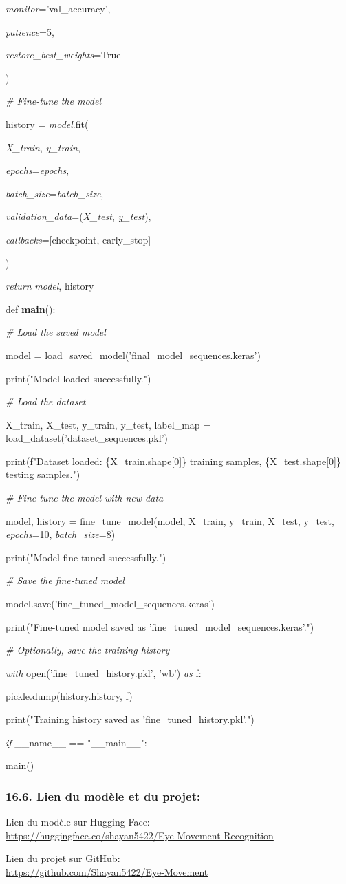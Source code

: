 \documentclass[
]{article}
\begin{document}
\emph{monitor}='val\_accuracy',

\emph{patience}=5,

\emph{restore\_best\_weights}=True

)

\emph{\# Fine-tune the model}

history = \emph{model}.fit(

\emph{X\_train}, \emph{y\_train},

\emph{epochs}=\emph{epochs},

\emph{batch\_size}=\emph{batch\_size},

\emph{validation\_data}=(\emph{X\_test}, \emph{y\_test}),

\emph{callbacks}={[}checkpoint, early\_stop{]}

)

\emph{return} \emph{model}, history

def \textbf{main}():

\emph{\# Load the saved model}

model = load\_saved\_model('final\_model\_sequences.keras')

print("Model loaded successfully.")

\emph{\# Load the dataset}

X\_train, X\_test, y\_train, y\_test, label\_map = load\_dataset('dataset\_sequences.pkl')

print(f"Dataset loaded: \{X\_train.shape{[}0{]}\} training samples, \{X\_test.shape{[}0{]}\} testing samples.")

\emph{\# Fine-tune the model with new data}

model, history = fine\_tune\_model(model, X\_train, y\_train, X\_test, y\_test, \emph{epochs}=10, \emph{batch\_size}=8)

print("Model fine-tuned successfully.")

\emph{\# Save the fine-tuned model}

model.save('fine\_tuned\_model\_sequences.keras')

print("Fine-tuned model saved as 'fine\_tuned\_model\_sequences.keras'.")

\emph{\# Optionally, save the training history}

\emph{with} open('fine\_tuned\_history.pkl', 'wb') \emph{as} f:

pickle.dump(history.history, f)

print("Training history saved as 'fine\_tuned\_history.pkl'.")

\emph{if} \_\_name\_\_ == "\_\_main\_\_":

main()

\hypertarget{lien-du-moduxe8le-et-du-projet}{%
\subsubsection{16.6. Lien du modèle et du projet:}\label{lien-du-moduxe8le-et-du-projet}}

Lien du modèle sur Hugging Face:\\
\underline{https://huggingface.co/shayan5422/Eye-Movement-Recognition}

Lien du projet sur GitHub:\\
\underline{https://github.com/Shayan5422/Eye-Movement}{}
\end{document}
